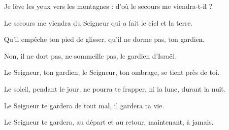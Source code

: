 \item Je lève les yeux vers les montagnes : d'où le secours me viendra-t-il ?

\item Le secours me viendra du Seigneur qui a fait le ciel et la terre.

\item Qu'il empêche ton pied de glisser, qu'il ne dorme pas, ton gardien.

\item Non, il ne dort pas, ne sommeille pas, le gardien d'Israël.

\item Le Seigneur, ton gardien, le Seigneur, ton ombrage, se tient près de toi.

\item Le soleil, pendant le jour, ne pourra te frapper, ni la lune, durant la nuit.

\item Le Seigneur te gardera de tout mal, il gardera ta vie.

\item Le Seigneur te gardera, au départ et au retour, maintenant, à jamais.
